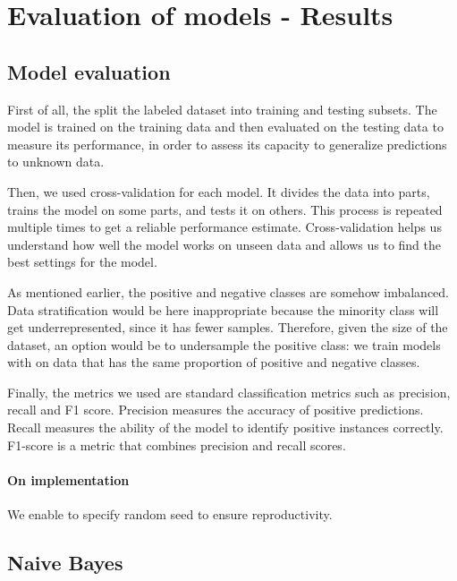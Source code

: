 \documentclass{article}
\begin{document}
\section{Evaluation of models - Results}

\subsection{Model evaluation}

First of all, the split the labeled dataset into training and testing subsets. The model is trained on the training data and then evaluated on the testing data to measure its performance, in order to assess its capacity to generalize predictions to unknown data.

Then, we used cross-validation for each model. It divides the data into parts, trains the model on some parts, and tests it on others. This process is repeated multiple times to get a reliable performance estimate. Cross-validation helps us understand how well the model works on unseen data and allows us to find the best settings for the model.

As mentioned earlier, the positive and negative classes are somehow imbalanced. Data stratification would be here inappropriate because the minority class will get underrepresented, since it has fewer samples.
Therefore, given the size of the dataset, an option would be to undersample the positive class: we train models with on data that has the same proportion of positive and negative classes.

Finally, the metrics we used are standard classification metrics such as precision, recall and F1 score.
Precision measures the accuracy of positive predictions. Recall measures the ability of the model to identify positive instances correctly. F1-score is a metric that combines precision and recall scores.

\paragraph{On implementation} We enable to specify random seed to ensure reproductivity.

\subsection{Naive Bayes}
\end{document}

